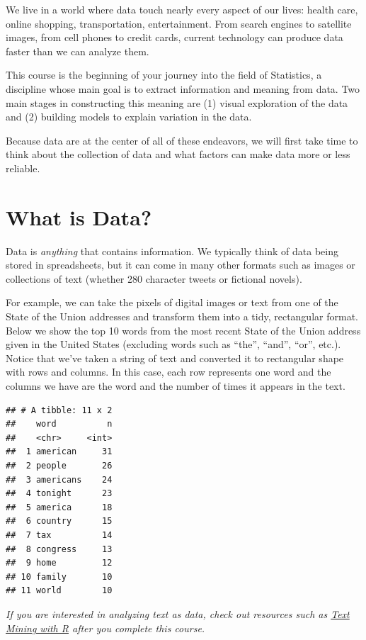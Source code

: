 \documentclass[
]{book}
\begin{document}
We live in a world where data touch nearly every aspect of our lives: health care, online shopping, transportation, entertainment. From search engines to satellite images, from cell phones to credit cards, current technology can produce data faster than we can analyze them.

This course is the beginning of your journey into the field of Statistics, a discipline whose main goal is to extract information and meaning from data. Two main stages in constructing this meaning are (1) visual exploration of the data and (2) building models to explain variation in the data.

Because data are at the center of all of these endeavors, we will first take time to think about the collection of data and what factors can make data more or less reliable.

\hypertarget{what-is-data}{%
\section{What is Data?}\label{what-is-data}}

Data is \emph{anything} that contains information. We typically think of data being stored in spreadsheets, but it can come in many other formats such as images or collections of text (whether 280 character tweets or fictional novels).

For example, we can take the pixels of digital images or text from one of the State of the Union addresses and transform them into a tidy, rectangular format. Below we show the top 10 words from the most recent State of the Union address given in the United States (excluding words such as ``the'', ``and'', ``or'', etc.). Notice that we've taken a string of text and converted it to rectangular shape with rows and columns. In this case, each row represents one word and the columns we have are the word and the number of times it appears in the text.

\begin{verbatim}
## # A tibble: 11 x 2
##    word          n
##    <chr>     <int>
##  1 american     31
##  2 people       26
##  3 americans    24
##  4 tonight      23
##  5 america      18
##  6 country      15
##  7 tax          14
##  8 congress     13
##  9 home         12
## 10 family       10
## 11 world        10
\end{verbatim}

\emph{If you are interested in analyzing text as data, check out resources such as \href{https://www.tidytextmining.com/}{Text Mining with R} after you complete this course.}
\end{document}
